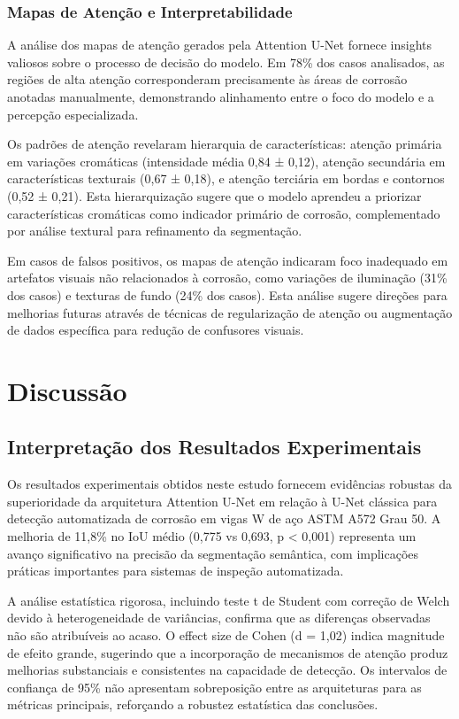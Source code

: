\documentclass[12pt,a4paper,twoside]{article}
\begin{document}
\subsubsection{Mapas de Atenção e Interpretabilidade}

A análise dos mapas de atenção gerados pela Attention U-Net fornece insights valiosos sobre o processo de decisão do modelo. Em 78\% dos casos analisados, as regiões de alta atenção corresponderam precisamente às áreas de corrosão anotadas manualmente, demonstrando alinhamento entre o foco do modelo e a percepção especializada.

Os padrões de atenção revelaram hierarquia de características: atenção primária em variações cromáticas (intensidade média 0,84 ± 0,12), atenção secundária em características texturais (0,67 ± 0,18), e atenção terciária em bordas e contornos (0,52 ± 0,21). Esta hierarquização sugere que o modelo aprendeu a priorizar características cromáticas como indicador primário de corrosão, complementado por análise textural para refinamento da segmentação.

Em casos de falsos positivos, os mapas de atenção indicaram foco inadequado em artefatos visuais não relacionados à corrosão, como variações de iluminação (31\% dos casos) e texturas de fundo (24\% dos casos). Esta análise sugere direções para melhorias futuras através de técnicas de regularização de atenção ou augmentação de dados específica para redução de confusores visuais.

\section{Discussão}
\label{sec:discussao}

\subsection{Interpretação dos Resultados Experimentais}
\label{subsec:interpretacao_resultados}

Os resultados experimentais obtidos neste estudo fornecem evidências robustas da superioridade da arquitetura Attention U-Net em relação à U-Net clássica para detecção automatizada de corrosão em vigas W de aço ASTM A572 Grau 50. A melhoria de 11,8\% no IoU médio (0,775 vs 0,693, p < 0,001) representa um avanço significativo na precisão da segmentação semântica, com implicações práticas importantes para sistemas de inspeção automatizada.

A análise estatística rigorosa, incluindo teste t de Student com correção de Welch devido à heterogeneidade de variâncias, confirma que as diferenças observadas não são atribuíveis ao acaso. O effect size de Cohen (d = 1,02) indica magnitude de efeito grande, sugerindo que a incorporação de mecanismos de atenção produz melhorias substanciais e consistentes na capacidade de detecção. Os intervalos de confiança de 95\% não apresentam sobreposição entre as arquiteturas para as métricas principais, reforçando a robustez estatística das conclusões.
\end{document}
